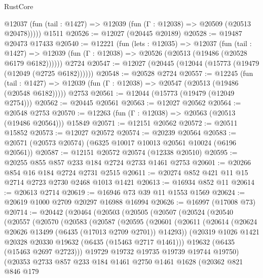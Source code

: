 \begin{lexlean}{RustCore}
\begin{coremodule}
      @12037 (fun (tail : @1427) => @12039 (fun (Γ : @12038) => @20509 (@20513 @20478)))))
    @1511
@20526 := @12027 (@20445 @20189)
@20528 := @19487 @20473 @17433
@20540 := @12221
    (fun (lets : @12035) =>
    @12037
      (fun (tail : @1427) =>
      @12039 (fun (Γ : @12038) => @20526 (@20513 (@19486 (@20528 @6179 @6182))))))
    @2724
@20547 := @12027 (@20445 (@12044 (@15773 (@19479 (@12049 (@2725 @6182))))))
@20548 := @20528 @2724
@20557 := @12245
    (fun (tail : @1427) => @12039 (fun (Γ : @12038) => @20547 (@20513 (@19486 (@20548 @6182)))))
    @2753
@20561 := @12044 (@15773 (@19479 (@12049 @2754)))
@20562 := @20445 @20561
@20563 := @12027 @20562
@20564 := @20548 @2753
@20570 := @12263 (fun (Γ : @12038) => @20563 (@20513 (@19486 @20564))) @15849
@20571 := @12151 @20562
@20572 := @20511 @15852
@20573 := @12027 @20572
@20574 := @20239 @20564
@20583 := @20571 (@20573 @20574) (@6325 @10017 @10013 @20561 @10024 (@6196 @20561))
@20587 := @12151 @20572 @20574 (@12338 @20510)
@20595 := @20255 @855 @857 @233 @184 @2724 @2733 @1461 @2753
@20601 := @20266 @854 @16 @184 @2724 @2731 @2515
@20611 := @20274 @852 @421 @11 @15 @2714 @2723 @2730 @2468 @1013 @1421
@20613 := @16934 @852 @11
@20614 := @20613 @2714
@20619 := @16946 @73 @39 @11 @1553 @1569
@20624 := @20619 @1000 @2709 @20297 @16988 @16994
@20626 := @16997 (@17008 @73)
@20714 := @20442
    (@20464
      (@20503
        (@20505
          (@20507
            (@20524
              (@20540
                (@20557
                  (@20570
                    (@20583
                      (@20587
                        (@20595
                          (@20601
                            (@20611
                              (@20614 (@20624 @20626 @13499 (@6435 (@17013 @2709 @2701)) @14293))
                              (@20319 @1026 @1421 @20328 @20330 @19632 (@6435 (@15463 @2717 @1461)))
                              @19632
                              (@6435 (@15463 @2697 @2723)))
                            @19729
                            @19732
                            @19735
                            @19739
                            @19744
                            @19750)
                          (@20353
                            @2733
                            @857
                            @233
                            @184
                            @1461
                            @2750
                            @1461
                            @1628
                            (@20362
                              @821
                              @846
                              @179

\end{coremodule}
\end{lexlean}
